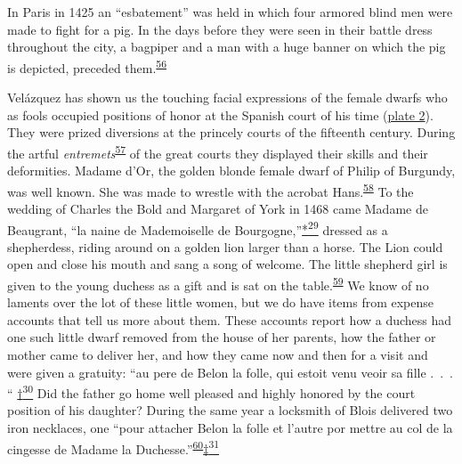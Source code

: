 \protect\hypertarget{08_Chapter_One__THE_PASSIONATE_INTE.xhtmlux5cux23page_23}{}{}In
Paris in 1425 an ``esbatement'' was held in which four armored blind men
were made to fight for a pig. In the days before they were seen in their
battle dress throughout the city, a bagpiper and a man with a huge
banner on which the pig is depicted, preceded
them.\textsuperscript{\protect\hypertarget{08_Chapter_One__THE_PASSIONATE_INTE.xhtmlux5cux23id_2119}{\protect\hyperlink{23_NOTES.xhtmlux5cux23id_2120}{56}}}

Velázquez has shown us the touching facial expressions of the female
dwarfs who as fools occupied positions of honor at the Spanish court of
his time
(\protect\hyperlink{20_ILLUSTRATIONS_FOLLOW_PAGE.xhtmlux5cux23id_3}{plate
2}). They were prized diversions at the princely courts of the fifteenth
century. During the artful
\emph{entremets}\textsuperscript{\protect\hypertarget{08_Chapter_One__THE_PASSIONATE_INTE.xhtmlux5cux23id_2117}{\protect\hyperlink{23_NOTES.xhtmlux5cux23id_2118}{57}}}
of the great courts they displayed their skills and their deformities.
Madame d'Or, the golden blonde female dwarf of Philip of Burgundy, was
well known. She was made to wrestle with the acrobat
Hans.\textsuperscript{\protect\hypertarget{08_Chapter_One__THE_PASSIONATE_INTE.xhtmlux5cux23id_2115}{\protect\hyperlink{23_NOTES.xhtmlux5cux23id_2116}{58}}}
To the wedding of Charles the Bold and Margaret of York in 1468 came
Madame de Beaugrant, ``la naine de Mademoiselle de
Bourgogne,''\protect\hypertarget{08_Chapter_One__THE_PASSIONATE_INTE.xhtmlux5cux23id_2391}{\protect\hyperlink{23_NOTES.xhtmlux5cux23id_2392}{*\textsuperscript{29}}}
dressed as a shepherdess, riding around on a golden lion larger than a
horse. The Lion could open and close his mouth and sang a song of
welcome. The little shepherd girl is given to the young duchess as a
gift and is sat on the
table.\textsuperscript{\protect\hypertarget{08_Chapter_One__THE_PASSIONATE_INTE.xhtmlux5cux23id_2113}{\protect\hyperlink{23_NOTES.xhtmlux5cux23id_2114}{59}}}
We know of no laments over the lot of these little women, but we do have
items from expense accounts that tell us more about them. These accounts
report how a duchess had one such little dwarf removed from the house of
her parents, how the father or mother came to deliver her, and how they
came now and then for a visit and were given a gratuity: ``au pere de
Belon la folle, qui estoit venu veoir sa fille .~.~. ``
\protect\hypertarget{08_Chapter_One__THE_PASSIONATE_INTE.xhtmlux5cux23id_2393}{\protect\hyperlink{23_NOTES.xhtmlux5cux23id_2394}{†\textsuperscript{30}}}
Did the father go home well pleased and highly honored by the court
position of his daughter? During the same year a locksmith of Blois
delivered two iron necklaces, one ``pour attacher Belon la folle et
l'autre por mettre au col de la cingesse de Madame la
Duchesse.''\textsuperscript{\protect\hypertarget{08_Chapter_One__THE_PASSIONATE_INTE.xhtmlux5cux23id_2111}{\protect\hyperlink{23_NOTES.xhtmlux5cux23id_2112}{60}}}\protect\hypertarget{08_Chapter_One__THE_PASSIONATE_INTE.xhtmlux5cux23id_2395}{\protect\hyperlink{23_NOTES.xhtmlux5cux23id_2396}{‡\textsuperscript{31}}}

